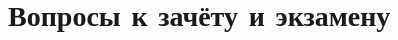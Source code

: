 \documentclass[main.tex]{subfiles}
\begin{document}
\section{Вопросы к зачёту и экзамену}
\end{document}
